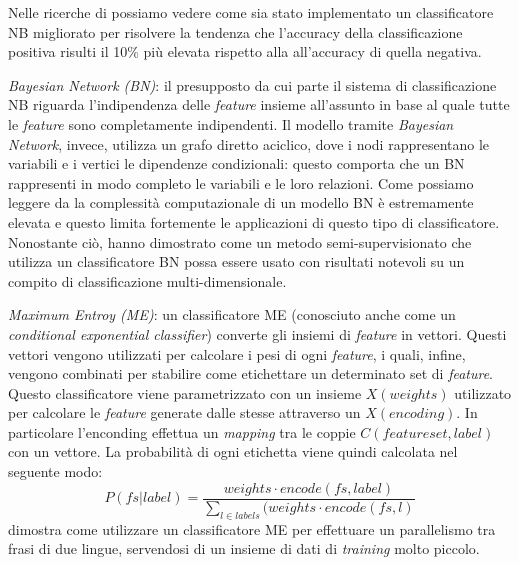 \documentclass[a4paper,12pt,openright,twoside]{report}
\theoremstyle{definition}
\begin{document}
Nelle ricerche di \cite{Kang2012}
possiamo vedere come sia stato implementato un classificatore NB migliorato per risolvere
la tendenza che l'accuracy della classificazione positiva risulti il 10\% più elevata rispetto alla
all'accuracy di quella negativa.

\emph{Bayesian Network (BN)}: il presupposto da cui parte il sistema di classificazione NB riguarda
l'indipendenza delle \emph{feature} insieme all'assunto in base al quale tutte le \emph{feature}
sono completamente indipendenti. Il modello tramite \emph{Bayesian Network}, invece, utilizza
un grafo diretto aciclico, dove i nodi rappresentano le variabili e i vertici le dipendenze condizionali:
 questo
comporta che un BN rappresenti in modo completo le variabili e le loro relazioni.
Come possiamo leggere da \cite{Cruz2013}
la complessità computazionale di un modello BN 
è estremamente
elevata e questo limita fortemente le applicazioni di questo tipo di classificatore.
Nonostante ciò, \cite{Hern2012}
hanno dimostrato come un metodo semi-supervisionato che utilizza un classificatore BN possa essere
usato con risultati notevoli su un compito di classificazione multi-dimensionale.

\emph{Maximum Entroy (ME)}: un classificatore ME (conosciuto  anche come un \emph{conditional exponential classifier})
converte gli insiemi di \emph{feature} in vettori. Questi vettori vengono utilizzati per calcolare i pesi
di ogni \emph{feature}, i quali, infine, vengono combinati per stabilire come etichettare un determinato
set di \emph{feature}. Questo classificatore viene parametrizzato con un insieme $X(weights)$ utilizzato per 
calcolare le \emph{feature} generate dalle stesse attraverso un $X(encoding)$. In 
particolare l'enconding effettua un \emph{mapping} tra le coppie $C(featureset,label)$ con un vettore. La
probabilità di ogni etichetta viene quindi calcolata nel seguente modo:
\begin{equation}
	P(fs|label)=\frac{weights \cdot encode(fs,label)}{\sum\nolimits_{l\in labels}(weights \cdot encode(fs,l)}
	\label{ME}
\end{equation}
\cite{Kaufmann2012}
dimostra come utilizzare un classificatore ME per effettuare un parallelismo tra frasi di due lingue,
 servendosi
di un insieme di dati di \emph{training} molto piccolo.
\end{document}
